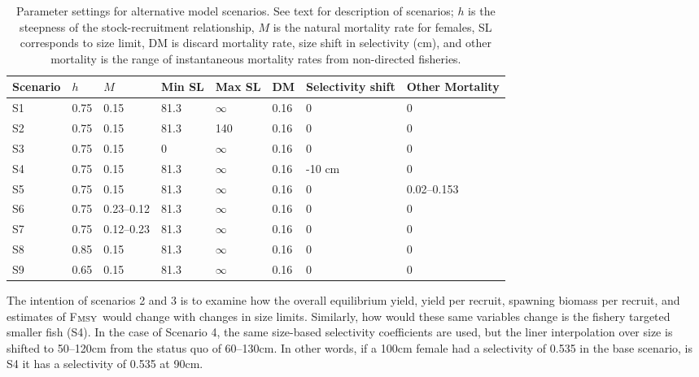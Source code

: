 \begin{table}[!tbh]
	\caption{Parameter settings for alternative model scenarios.  See text for description of scenarios; $h$ is the steepness of the stock-recruitment relationship, $M$ is the natural mortality rate for females, SL corresponds to size limit, DM is discard mortality rate, size shift in selectivity (cm), and other mortality is the range of instantaneous mortality rates from non-directed fisheries.}
	\label{table:Scenarios}
	\begin{center}
	\begin{tabular}{lll lll ll}
		\hline
		Scenario & $h$ & $M$        & Min  SL & Max SL     & DM   &Selectivity shift & Other Mortality  \\
		\hline                                
		S1       &0.75 & 0.15       & 81.3    & $\infty$   & 0.16 & 0                & 0                \\
		S2       &0.75 & 0.15       & 81.3    & 140        & 0.16 & 0                & 0                \\
		S3       &0.75 & 0.15       & 0       & $\infty$   & 0.16 & 0                & 0                \\
		S4       &0.75 & 0.15       & 81.3    & $\infty$   & 0.16 & -10 cm           & 0                \\
		S5       &0.75 & 0.15       & 81.3    & $\infty$   & 0.16 & 0                & 0.02--0.153      \\
		S6       &0.75 & 0.23--0.12 & 81.3    & $\infty$   & 0.16 & 0                & 0                \\
		S7       &0.75 & 0.12--0.23 & 81.3    & $\infty$   & 0.16 & 0                & 0                \\
		S8       &0.85 & 0.15       & 81.3    & $\infty$   & 0.16 & 0                & 0                \\
		S9       &0.65 & 0.15       & 81.3    & $\infty$   & 0.16 & 0                & 0                \\
		\hline
	\end{tabular}
	\end{center}
\end{table}

The intention of scenarios 2 and 3 is to examine how the overall equilibrium yield, yield per recruit, spawning biomass per recruit, and estimates of F$_{\rm{MSY}}$ would change with changes in size limits.  Similarly, how would these same variables change is the fishery targeted smaller fish (S4).  In the case of Scenario 4, the same size-based selectivity coefficients are used, but the liner interpolation over size is shifted to 50--120cm from the status quo of 60--130cm.  In other words, if a 100cm female had a selectivity of 0.535 in the base scenario, is S4 it has a selectivity of 0.535 at 90cm.  



